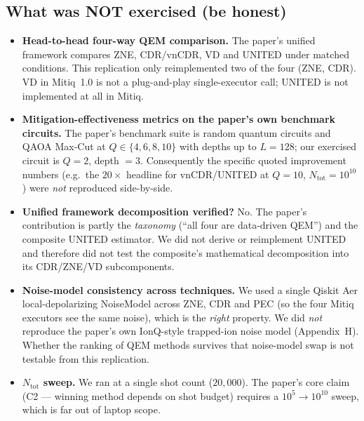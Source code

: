\documentclass[11pt]{article}
\begin{document}
\subsection{What was NOT exercised (be honest)}
\begin{itemize}
  \item \textbf{Head-to-head four-way QEM comparison.} The paper's
    unified framework compares ZNE, CDR/vnCDR, VD and UNITED under
    matched conditions.  This replication only reimplemented two of
    the four (ZNE, CDR).  VD in Mitiq~1.0 is not a plug-and-play
    single-executor call; UNITED is not implemented at all in Mitiq.
  \item \textbf{Mitigation-effectiveness metrics on the paper's own
    benchmark circuits.}  The paper's benchmark suite is random
    quantum circuits and QAOA Max-Cut at $Q\in\{4,6,8,10\}$ with depths
    up to $L=128$; our exercised circuit is $Q=2$, depth $=3$.
    Consequently the specific quoted improvement numbers (e.g.\ the
    $20\times$ headline for vnCDR/UNITED at $Q=10$, $N_{\mathrm{tot}}=10^{10}$)
    were \emph{not} reproduced side-by-side.
  \item \textbf{Unified framework decomposition verified?} No.  The
    paper's contribution is partly the \emph{taxonomy}
    (``all four are data-driven QEM'') and the composite UNITED
    estimator.  We did not derive or reimplement UNITED and therefore
    did not test the composite's mathematical decomposition into its
    CDR/ZNE/VD subcomponents.
  \item \textbf{Noise-model consistency across techniques.}  We used
    a single Qiskit Aer local-depolarizing NoiseModel across ZNE, CDR
    and PEC (so the four Mitiq executors see the same noise), which
    is the \emph{right} property.  We did \emph{not} reproduce the
    paper's own IonQ-style trapped-ion noise model (Appendix~H).
    Whether the ranking of QEM methods survives that noise-model swap
    is not testable from this replication.
  \item \textbf{$N_{\mathrm{tot}}$ sweep.}  We ran at a single
    shot count ($20{,}000$).  The paper's core claim (C2 --- winning
    method depends on shot budget) requires a $10^5\!\to\!10^{10}$
    sweep, which is far out of laptop scope.
\end{itemize}
\end{document}
